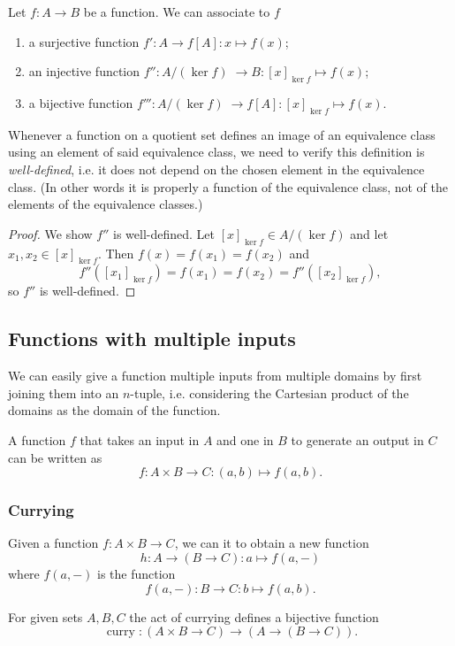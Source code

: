 \begin{proposition}
Let $f:A\to B$ be a function. We can associate to $f$
\begin{enumerate}
\item a surjective function $f': A\to f[A]: x\mapsto f(x)$;
\item an injective function $f'': A/(\ker f) \;\to B: [x]_{\ker f}\mapsto f(x)$;
\item a bijective function $f''': A/(\ker f) \;\to f[A]: [x]_{\ker f}\mapsto f(x)$.
\end{enumerate}
\end{proposition}
Whenever a function on a quotient set defines an image of an equivalence class using an element of said equivalence class, we need to verify this definition is \emph{well-defined}, i.e. it does not depend on the chosen element in the equivalence class. (In other words it is properly a function of the equivalence class, not of the elements of the equivalence classes.)
\begin{proof}
We show $f''$ is well-defined. Let $[x]_{\ker f}\in A/(\ker f)$ and let $x_1,x_2\in [x]_{\ker f}$. Then $f(x) = f(x_1) = f(x_2)$ and
\[ f''([x_1]_{\ker f}) = f(x_1) = f(x_2) = f''([x_2]_{\ker f}), \]
so $f''$ is well-defined.
\end{proof}

\subsection{Functions with multiple inputs}
We can easily give a function multiple inputs from multiple domains by first joining them into an $n$-tuple, i.e. considering the Cartesian product of the domains as the domain of the function.

\begin{example}
A function $f$ that takes an input in $A$ and one in $B$ to generate an output in $C$ can be written as
\[ f: A\times B \to C: (a,b)\mapsto f(a,b). \]
\end{example}
\subsubsection{Currying}
\begin{definition}
Given a function $f: A\times B \to C$, we can  it to obtain a new function
\[ h: A \to (B\to C): a\mapsto f(a,-) \]
where $f(a,-)$ is the function
\[ f(a,-): B \to C: b\mapsto f(a,b). \]
\end{definition}
\begin{lemma}
For given sets $A,B,C$ the act of currying defines a bijective function
\[ \operatorname{curry}: (A\times B \to C) \to (A \to (B\to C)). \]
\end{lemma}

